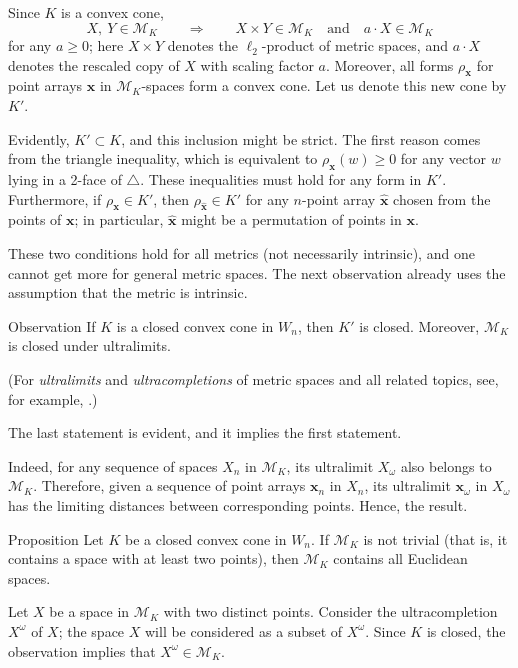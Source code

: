 Since $K$ is a convex cone,
\[X,\ Y\in  \mathcal{M}_K
\qquad\Longrightarrow\qquad
X\times Y\in\mathcal{M}_K
\quad\text{and}\quad
a\cdot X\in\mathcal{M}_K
\]
for any $a\geqslant 0$;
here $X\times Y$ denotes the $\ell_2$-product of metric spaces, and
$a\cdot X$ denotes the rescaled copy of $X$ with scaling factor $a$.
Moreover, all forms $\rho_{\bm{x}}$ for point arrays $\bm{x}$ in $\mathcal{M}_K$-spaces form a convex cone.
Let us denote this new cone by $K'$.

Evidently, $K'\subset K$, and this inclusion might be strict.
The first reason comes from the triangle inequality, which is equivalent to $\rho_{\bm{x}}(w)\geqslant 0$ for any vector $w$ lying in a 2-face of $\triangle$.
These inequalities must hold for any form in $K'$.
Furthermore, if $\rho_{\bm{x}}\in K'$, then $\rho_{\hat{\bm{x}}}\in K'$ for any $n$-point array $\hat{\bm{x}}$ chosen from the points of $\bm{x}$; in particular, $\hat{\bm{x}}$ might be a permutation of points in $\bm{x}$.

These two conditions hold for all metrics (not necessarily intrinsic),
and one cannot get more for general metric spaces.
The next observation already uses the assumption that the metric is intrinsic.

\begin{thm}{Observation}
If $K$ is a closed convex cone in $W_n$, then $K'$ is closed.
Moreover, $\mathcal{M}_K$ is closed under ultralimits.
\end{thm}

(For \emph{ultralimits} and \emph{ultracompletions} of metric spaces and all related topics, see, for example, \cite{petrunin2023}.)

The last statement is evident, and it implies the first statement.

Indeed, for any sequence of spaces $X_n$ in $\mathcal{M}_K$, its ultralimit $X_\omega$ also belongs to $\mathcal{M}_K$.
Therefore, given a sequence of point arrays $\bm{x}_n$ in $X_n$,
its ultralimit $\bm{x}_\omega$ in $X_\omega$ has the limiting distances between corresponding points.
Hence, the result.
\qeds

\begin{thm}{Proposition}\label{prop:Associated form}
Let $K$ be a closed convex cone in $W_n$.
If $\mathcal{M}_K$ is not trivial (that is, it contains a space with at least two points), then $\mathcal{M}_K$ contains all Euclidean spaces.
\end{thm}

Let $X$ be a space in $\mathcal{M}_K$ with two distinct points.
Consider the ultracompletion $X^\omega$ of $X$;
the space $X$ will be considered as a subset of $X^\omega$.
Since $K$ is closed, the observation implies that $X^\omega\in \mathcal{M}_K$.

